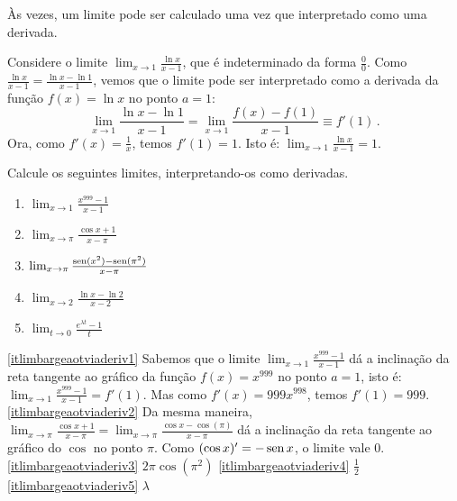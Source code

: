 Às vezes, um limite pode ser calculado uma vez que interpretado como uma
derivada.
\begin{ex}
Considere o limite $\lim_{x\to 1}\frac{\ln x}{x-1}$, que é indeterminado da
forma $\frac00$.
Como $\frac{\ln x}{x-1}=\frac{\ln x-\ln 1}{x-1}$, vemos que o limite pode ser
interpretado como a derivada da função $f(x)=\ln x$ no ponto $a=1$:
$$\lim_{x\to 1}\frac{\ln x-\ln 1}{x-1}=\lim_{x\to 1}\frac{f(x)-f(1)}{x-1}\equiv
f'(1)\,.$$ 
Ora, como $f'(x)=\frac{1}{x}$, temos $f'(1)=1$. Isto é: $\lim_{x\to 1}\frac{\ln
x}{x-1}=1$.
\end{ex}

\begin{exo}
Calcule os seguintes limites, interpretando-os como derivadas.
\begin{multicols}{3}
\begin{enumerate}
\item\label{itlimbargeaotviaderiv1} $\lim_{x\to 1}\frac{x^{999}-1}{x-1}$
\item\label{itlimbargeaotviaderiv2} $\lim_{x\to \pi}\frac{\cos x+1}{x-\pi}$
\item\label{itlimbargeaotviaderiv3} $\lim_{x\to \pi}\frac{\operatorname{sen} (x^2)-\operatorname{sen}
(\pi^2)}{x-\pi}$
\item\label{itlimbargeaotviaderiv4} $\lim_{x\to 2}\frac{\ln x-\ln 2}{x-2}$
\item\label{itlimbargeaotviaderiv5} $\lim_{t\to 0}\frac{e^{\lambda t}-1}{t}$
\end{enumerate}
\end{multicols}
\vspace{0.01cm}
\begin{sol}
\eqref{itlimbargeaotviaderiv1}
Sabemos que o limite $\lim_{x\to 1}\frac{x^{999}-1}{x-1}$ dá a inclinação da
reta tangente ao gráfico da função $f(x)=x^{999}$ no ponto $a=1$, isto é:
$\lim_{x\to 1}\frac{x^{999}-1}{x-1}=f'(1)$. Mas como 
$f'(x)=999x^{998}$, temos $f'(1)=999$.
\eqref{itlimbargeaotviaderiv2}
Da mesma maneira, $\lim_{x\to \pi}\frac{\cos x+1}{x-\pi}=
\lim_{x\to \pi}\frac{\cos x-\cos(\pi)}{x-\pi}$ dá a inclinação da reta tangente
ao gráfico do $\cos$ no ponto $\pi$. Como $(\cos x)'=-\operatorname{sen} x$, o limite vale
$0$.
\eqref{itlimbargeaotviaderiv3} $2\pi \cos(\pi^2)$
\eqref{itlimbargeaotviaderiv4} $\frac12$
\eqref{itlimbargeaotviaderiv5} $\lambda$
\end{sol}
\end{exo}

